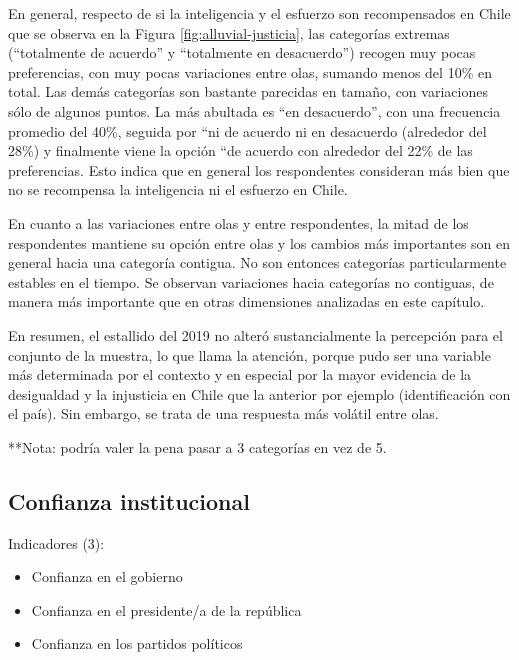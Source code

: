 \documentclass[
  12pt,
]{book}
\begin{document}
En general, respecto de si la inteligencia y el esfuerzo son recompensados en Chile que se observa en la Figura \ref{fig:alluvial-justicia}, las categorías extremas (``totalmente de acuerdo'' y ``totalmente en desacuerdo'') recogen muy pocas preferencias, con muy pocas variaciones entre olas, sumando menos del 10\% en total. Las demás categorías son bastante parecidas en tamaño, con variaciones sólo de algunos puntos. La más abultada es ``en desacuerdo'', con una frecuencia promedio del 40\%, seguida por ``ni de acuerdo ni en desacuerdo (alrededor del 28\%) y finalmente viene la opción ``de acuerdo con alrededor del 22\% de las preferencias. Esto indica que en general los respondentes consideran más bien que no se recompensa la inteligencia ni el esfuerzo en Chile.

En cuanto a las variaciones entre olas y entre respondentes, la mitad de los respondentes mantiene su opción entre olas y los cambios más importantes son en general hacia una categoría contigua. No son entonces categorías particularmente estables en el tiempo. Se observan variaciones hacia categorías no contiguas, de manera más importante que en otras dimensiones analizadas en este capítulo.

En resumen, el estallido del 2019 no alteró sustancialmente la percepción para el conjunto de la muestra, lo que llama la atención, porque pudo ser una variable más determinada por el contexto y en especial por la mayor evidencia de la desigualdad y la injusticia en Chile que la anterior por ejemplo (identificación con el país). Sin embargo, se trata de una respuesta más volátil entre olas.

**Nota: podría valer la pena pasar a 3 categorías en vez de 5.

\hypertarget{confianza-institucional}{%
\subsection{Confianza institucional}\label{confianza-institucional}}

Indicadores (3):

\begin{itemize}
\item
  Confianza en el gobierno
\item
  Confianza en el presidente/a de la república
\item
  Confianza en los partidos políticos
\end{itemize}
\end{document}
